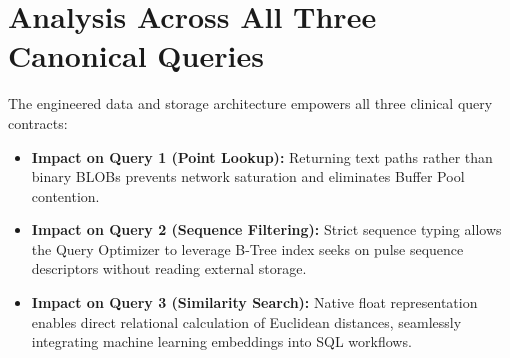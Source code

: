 \section{Analysis Across All Three Canonical Queries}
The engineered data and storage architecture empowers all three clinical query contracts:
\begin{itemize}
    \item \textbf{Impact on Query 1 (Point Lookup):} Returning text paths rather than binary BLOBs prevents network saturation and eliminates Buffer Pool contention.
    \item \textbf{Impact on Query 2 (Sequence Filtering):} Strict  sequence typing allows the Query Optimizer to leverage B-Tree index seeks on pulse sequence descriptors without reading external storage.
    \item \textbf{Impact on Query 3 (Similarity Search):} Native float representation enables direct relational calculation of Euclidean distances, seamlessly integrating machine learning embeddings into SQL workflows.
\end{itemize}
